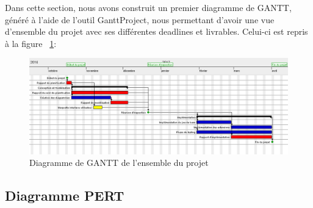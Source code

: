 \documentclass[]{article}
\newcommand{\placeholder}[1]{{\noindent \color{red}[ #1 ]}}
\begin{document}
Dans cette section, nous avons construit un premier diagramme de GANTT, généré à l'aide de l'outil GanttProject, nous permettant d'avoir une vue d'ensemble du projet avec ses différentes deadlines et livrables. Celui-ci est repris à la figure ~\ref{fig:GANTT2}:

\begin{figure}[!htb]
\begin{center}
  \includegraphics[width=\textwidth]{planif-end.png}
  \caption{Diagramme de GANTT de l'ensemble du projet}\label{fig:GANTT2}
\end{center}
\end{figure}
\FloatBarrier



\subsection{Diagramme PERT}

%
%
\end{document}
